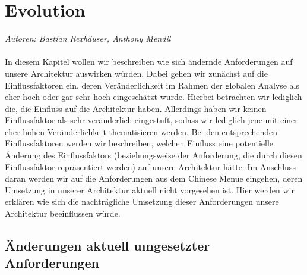 \documentclass[enabledeprecatedfontcommands,fontsize=11pt,paper=a4,twoside]{scrartcl}
\begin{document}



\newpage
\section{Evolution}
\label{sec:evolution}
\emph{Autoren: Bastian Rexhäuser, Anthony Mendil}\\\\
In diesem Kapitel wollen wir beschreiben wie sich ändernde Anforderungen auf unsere Architektur auswirken würden. Dabei gehen wir zunächst auf die Einflussfaktoren ein, deren Veränderlichkeit im Rahmen der globalen Analyse als eher hoch oder gar sehr hoch eingeschätzt wurde. Hierbei betrachten wir lediglich die, die Einfluss auf die Architektur haben. Allerdings haben wir keinen Einflussfaktor als sehr veränderlich eingestuft, sodass wir lediglich jene mit einer eher hohen Veränderlichkeit thematisieren werden. Bei den entsprechenden Einflussfaktoren werden wir beschreiben, welchen Einfluss eine potentielle Änderung des Einflussfaktors (beziehungsweise der Anforderung, die durch diesen Einflussfaktor repräsentiert werden) auf unsere Architektur hätte. Im Anschluss daran werden wir auf die Anforderungen aus dem Chinese Menue eingehen, deren Umsetzung in unserer Architektur aktuell nicht vorgesehen ist. Hier werden wir erklären wie sich die nachträgliche Umsetzung dieser Anforderungen unsere Architektur beeinflussen würde. \\ 
 
\subsection{Änderungen aktuell umgesetzter Anforderungen}
\end{document}
